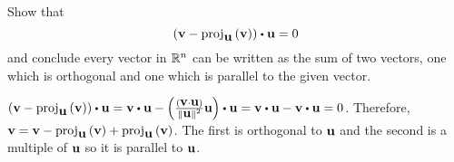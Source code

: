 \begin{enumialphparenastyle}
\begin{ex} Show that
  \begin{equation*}
    \tup{\vect{v}-\func{proj}_{\vect{u}
      }\tup{\vect{v}} } \dotprod \vect{u}=0
  \end{equation*}
  and conclude every vector in $\mathbb{R}^{n}$ can be written as the sum of
  two vectors, one which is orthogonal and one which is parallel to
  the given vector.
  \begin{sol}
    $\tup{\vect{v}-\func{proj}_{\vect{u}}\tup{\vect{v}} } \dotprod
    \vect{u} = \vect{v} \dotprod \vect{u}
    -\tup{\frac{\tup{\vect{v}\cdot\vect{u}} }{\norm{\vect{u}}
        ^{2}}\vect{u} } \dotprod \vect{u} = \vect{v} \dotprod \vect{u}
    - \vect{v} \dotprod \vect{u} =0$. Therefore,
    $\mbox{\bf v} = \mbox{\bf v} - \mbox{\rm proj}_{\mbox{\bf u}}\left(\mbox{\bf v}\right) +
    \mbox{\rm proj}_{\mbox{\bf u}}\left(\mbox{\bf v}\right)$. The first is orthogonal to
    $\mbox{\bf u}$ and the second is a multiple of $\mbox{\bf u}$ so it is
    parallel to $\mbox{\bf u}$.
  \end{sol}
\end{ex}

\end{enumialphparenastyle}

